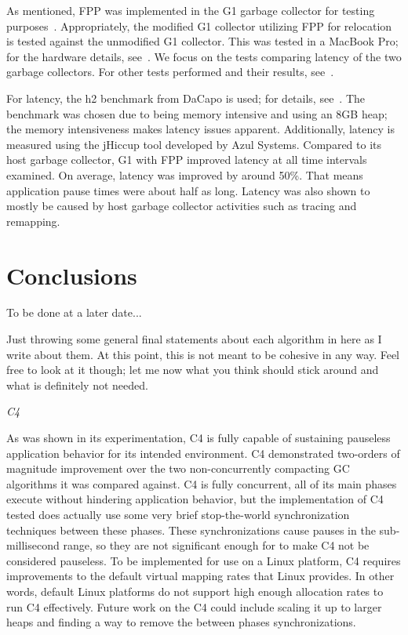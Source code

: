 \documentclass{sig-alternate}
\begin{document}
As mentioned, FPP was implemented in the G1 garbage collector for testing purposes~\cite{Osterlund:FPP}. 
Appropriately, the modified G1 collector utilizing FPP for relocation is tested against the
unmodified G1 collector. This was tested in a MacBook Pro; for the 
hardware details, see~\cite{Osterlund:FPP}. We focus on the tests comparing
latency of the two garbage collectors. For other tests performed and their results, see~\cite{Osterlund:FPP}.

For latency, the h2 benchmark from DaCapo is used; for details, see~\cite{Blackburn:DaCapo}.
The benchmark was chosen due to being memory intensive and using an 8GB heap;
the memory intensiveness makes latency issues apparent.
Additionally, latency is measured using the jHiccup tool developed by Azul Systems.
Compared to its host garbage collector, G1 with FPP improved latency at all time
intervals examined. On average, latency was improved by around 50\%. That means application
pause times were about half as long. Latency was also shown to mostly be caused by 
host garbage collector activities such as tracing and remapping.


\section{Conclusions}
\label{sec:conclusions}

To be done at a later date...

Just throwing some general final statements about each algorithm in here as I write about
them. At this point, this is not meant to be cohesive in any way. Feel free
to look at it though; let me now what you think should stick around and what is definitely
not needed.

\emph{C4}

As was shown in its experimentation, C4 is fully capable of sustaining pauseless application
behavior for its intended environment. C4 demonstrated two-orders of magnitude improvement
over the two non-concurrently compacting GC algorithms it was compared against. C4 is
fully concurrent, all of its main phases execute without hindering application behavior,
but the implementation of C4 tested does actually use some very brief stop-the-world synchronization
techniques between these phases. These synchronizations cause pauses in the sub-millisecond range, so
they are not significant enough for to make C4 not be considered pauseless. To be 
implemented for use on a Linux platform, C4 requires improvements to the default 
virtual mapping rates that Linux provides. In other words, default Linux platforms 
do not support high enough allocation rates to run C4 effectively. Future work 
on the C4 could include scaling it up to larger heaps and 
finding a way to remove the between phases synchronizations.
\end{document}
